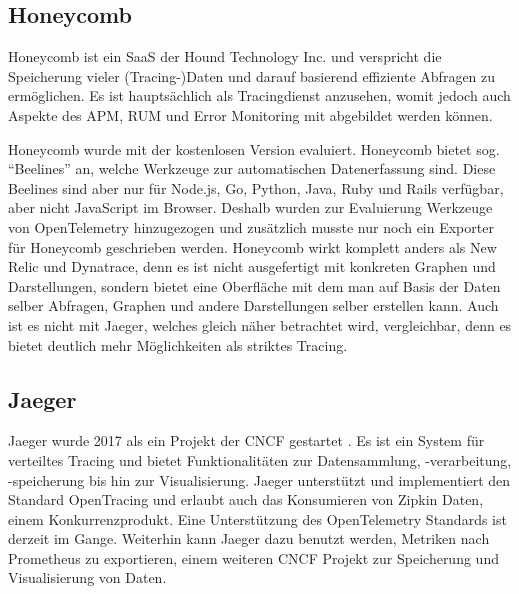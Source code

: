 \subsection{Honeycomb}

Honeycomb \cite{Honeycomb} ist ein SaaS der Hound Technology Inc. und verspricht die Speicherung vieler (Tracing-)Daten und darauf basierend effiziente Abfragen zu ermöglichen. Es ist hauptsächlich als Tracingdienst anzusehen, womit jedoch auch Aspekte des APM, RUM und Error Monitoring mit abgebildet werden können.

Honeycomb wurde mit der kostenlosen Version evaluiert. Honeycomb bietet sog. \enquote{Beelines} an, welche Werkzeuge zur automatischen Datenerfassung sind. Diese Beelines sind aber nur für Node.js, Go, Python, Java, Ruby und Rails verfügbar, aber nicht JavaScript im Browser. Deshalb wurden zur Evaluierung Werkzeuge von OpenTelemetry hinzugezogen und zusätzlich musste nur noch ein Exporter für Honeycomb geschrieben werden. Honeycomb wirkt komplett anders als New Relic und Dynatrace, denn es ist nicht ausgefertigt mit konkreten Graphen und Darstellungen, sondern bietet eine Oberfläche mit dem man auf Basis der Daten selber Abfragen, Graphen und andere Darstellungen selber erstellen kann. Auch ist es nicht mit Jaeger, welches gleich näher betrachtet wird, vergleichbar, denn es bietet deutlich mehr Möglichkeiten als striktes Tracing.

\subsection{Jaeger}

Jaeger wurde 2017 als ein Projekt der CNCF gestartet \cite{Jaeger}. Es ist ein System für verteiltes Tracing und bietet Funktionalitäten zur Datensammlung, -verarbeitung, -speicherung bis hin zur Visualisierung. Jaeger unterstützt und implementiert den Standard OpenTracing und erlaubt auch das Konsumieren von Zipkin Daten, einem Konkurrenzprodukt. Eine Unterstützung des OpenTelemetry Standards ist derzeit im Gange. Weiterhin kann Jaeger dazu benutzt werden, Metriken nach Prometheus \cite{Prometheus} zu exportieren, einem weiteren CNCF Projekt zur Speicherung und Visualisierung von Daten.

